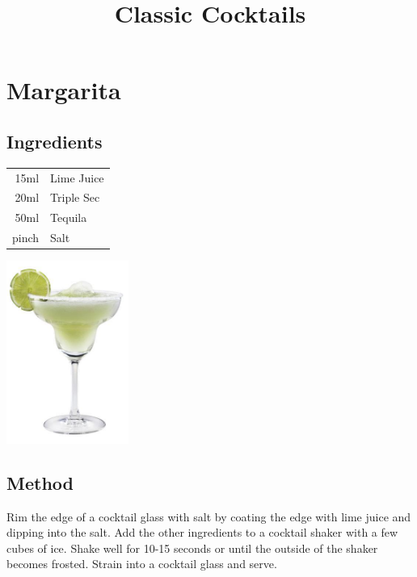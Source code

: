 \documentclass[12pt, letterpaper]{article}
\title{Classic Cocktails}
\begin{document}
\maketitle

\section{Margarita}

\subsection*{Ingredients}

\begin{multicols}{2}

\begin{tabular} { r | l}
    15ml & Lime Juice \\
    20ml & Triple Sec \\
    50ml & Tequila \\
    pinch & Salt
\end{tabular}

\includegraphics[height=6cm]{margarita}

\end{multicols}


\subsection*{Method}
Rim the edge of a cocktail glass with salt by coating the edge with lime juice and dipping into the salt.
Add the other ingredients to a cocktail shaker with a few cubes of ice.
Shake well for 10-15 seconds or until the outside of the shaker becomes frosted.
Strain into a cocktail glass and serve.
\end{document}
